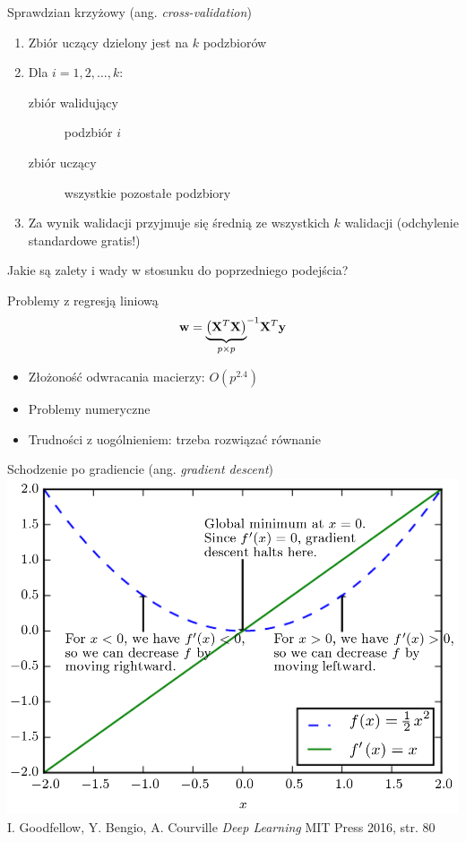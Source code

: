 \documentclass{sa}
\newcommand{\ang}[1]{(ang. \emph{#1})}
\renewcommand{\vec}[1]{\ensuremath\mathbf{#1}}
\begin{document}
\begin{frame}{Sprawdzian krzyżowy \ang{cross-validation}}
\begin{enumerate}
\item Zbiór uczący dzielony jest na $k$ podzbiorów
\item Dla $i=1,2,\ldots, k$:
\begin{description}
\item[zbiór walidujący] podzbiór $i$
\item[zbiór uczący]  wszystkie pozostałe podzbiory
\end{description}
\item Za wynik walidacji przyjmuje się średnią ze wszystkich $k$ walidacji (odchylenie standardowe gratis!)
\end{enumerate}

\vfill
Jakie są zalety i wady w stosunku do poprzedniego podejścia?
\end{frame}

\begin{frame}{Problemy z regresją liniową}
\[ \vec{w}={\underbrace{\left(\vec{X}^T\vec{X}\right)}_{p\times p}}^{-1}\vec{X}^T\vec{y} \]
\begin{itemize}
\item<+-> Złożoność odwracania macierzy: $O(p^{2.4})$ \\
\item<+-> Problemy numeryczne
\item<+-> Trudności z uogólnieniem: trzeba \alert{rozwiązać} równanie
\end{itemize}
\end{frame}

\begin{frame}{Schodzenie po gradiencie \ang{gradient descent}}
\centering
\includegraphics[width=.87\textwidth]{grad.png}
{\vfill\footnotesize I. Goodfellow, Y. Bengio, A. Courville \emph{Deep Learning} MIT Press 2016, str. 80}
\end{frame}
\end{document}

